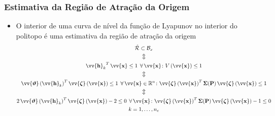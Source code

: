 \documentclass{beamer}
\newcommand*{\Round}[1]{\left(#1\right)}
\newcommand*{\Prod}{\,}
\newcommand*{\Bold}[1]{\boldsymbol{\mathbf{#1}}}
\newcommand*{\Matr}[1]{\Bold{#1}}
\newcommand*{\Vect}[1]{\vv{\Bold{#1}}}
\newcommand*{\Transp}[1]{{#1}^{T}}
\newcommand*{\ForAll}{\:\:\forall\,}
\newcommand*{\Viff}{\\\Updownarrow\\}
\renewcommand{\Prod}{\,}
\begin{document}
\begin{frame}\frametitle{Estimativa da Região de Atração da Origem}
  \begin{itemize}
    \item O interior de uma curva de nível da função de Lyapunov no interior do politopo é uma estimativa da região de atração da origem
    \begin{gather}
      \hat{\mathcal{R}} \subset \mathcal{B}_x
      \Viff
      \Transp{\Vect{h}_k} \Prod \Vect{x} \leq 1
      \ForAll \Vect{x} \colon V\Round{\Vect{x}} \leq 1
      \Viff
      \Transp{\Vect{\vartheta}\Round{\Vect{h}_k}} \Prod \Vect{\zeta}\Round{\Vect{x}} \leq 1
      \ForAll \Vect{x} \in \mathbb{R}^n \colon \Transp{\Vect{\zeta}\Round{\Vect{x}}} \Prod \Matr{\Sigma}(\Matr{P}) \Prod \Vect{\zeta}\Round{\Vect{x}} \leq 1
      \Viff
      2 \Prod \Transp{\Vect{\vartheta}\Round{\Vect{h}_k}} \Prod \Vect{\zeta}\Round{\Vect{x}} - 2 \leq 0
      \ForAll \Vect{x} \colon \Transp{\Vect{\zeta}\Round{\Vect{x}}} \Prod \Matr{\Sigma}(\Matr{P}) \Prod \Vect{\zeta}\Round{\Vect{x}} -1 \leq 0
      \\ k = 1, \dotsc, n_e
    \end{gather}
  \end{itemize}
\end{frame}
\end{document}
